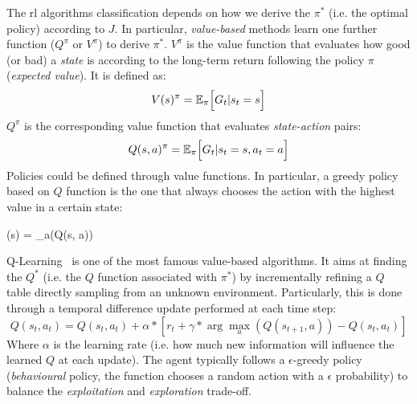The \ac{rl} algorithms classification depends on how we derive the $\pi^*$ (i.e. the optimal policy) according to $J$.
%
%
In particular, \emph{value-based} methods learn one further function ($Q^\pi$ or $V^\pi$) to derive $\pi^*$.
%
$V^\pi$ is the value function that evaluates how good (or bad) a \emph{state} is according to the long-term return following the policy $\pi$ (\emph{expected value}).
% 
It is defined as:
\begin{equation}
V(s)^\pi = \mathbb{E}_\pi \Big[ G_t | s_t = s \Big]
\end{equation}
$Q^\pi$ is the corresponding value function that evaluates \emph{state-action} pairs:
\begin{equation}
Q(s, a)^\pi = \mathbb{E}_\pi \Big[ G_t | s_t = s, a_t = a \Big]
\end{equation}
Policies could be defined through value functions. In particular, a greedy policy based on $Q$ function is the one that always chooses the action with the highest value in a certain state:
\begin{iequation}
\pi(s) = \arg \max_{a}(Q(s, a))
\end{iequation}

Q-Learning~\cite{DBLP:journals/ml/WatkinsD92} is one of the most famous value-based algorithms. 
 It aims at finding the $Q^*$ (i.e. the $Q$ function associated with $\pi^*$) by incrementally refining a $Q$ table directly sampling from an unknown environment.
%
Particularly, this is done through a temporal difference update performed at each time step:
\begin{equation}
Q(s_t, a_t) = Q(s_t, a_t) + \alpha *  [r_t + \gamma * \arg \max_{a}(Q(s_{t+1}, a)) - Q(s_t, a_t)]
\end{equation}
Where $\alpha$ is the learning rate (i.e. how much new information will influence the learned $Q$ at each update). 
%
The agent typically follows a $\epsilon$-greedy policy (\emph{behavioural} policy, the function chooses a random action with a $\epsilon$ probability) to balance the \emph{exploitation} and \emph{exploration} trade-off. 

